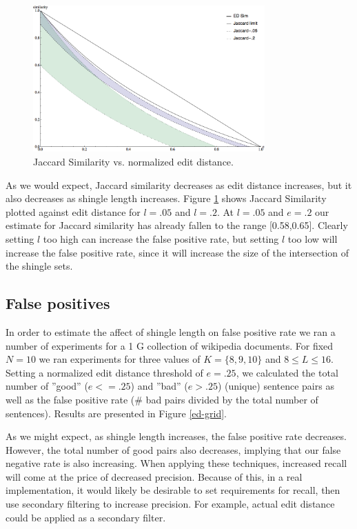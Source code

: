 \documentclass{acm_proc_article-sp}
\begin{document}
\begin{figure}
\centering
\includegraphics[width=3.5in, keepaspectratio = true]{jac-ed-chart.png}
\caption{Jaccard Similarity vs. normalized edit distance.}
\label{jac-ed}
\end{figure}

As we would expect, Jaccard similarity decreases as edit distance increases, but it also decreases as shingle length increases. Figure \ref{jac-ed} shows Jaccard Similarity plotted against edit distance for $l = .05$ and $l = .2$. At $l = .05$ and $e = .2$ our estimate for Jaccard similarity has already fallen to the range [0.58,0.65]. Clearly setting $l$ too high can increase the false positive rate, but setting $l$ too low will increase the false positive rate, since it will increase the size of the intersection of the shingle sets.

\subsection{False positives}

In order to estimate the affect of shingle length on false positive rate we ran a number of experiments for a 1 G collection of wikipedia documents. For fixed $N=10$ we ran experiments for three values of $K=\{8,9,10\}$ and $8 \le L \le 16$. Setting a normalized edit distance threshold of $e = .25$, we calculated the total number of ''good'' ($e <= .25$) and ''bad'' ($e > .25$) (unique) sentence pairs as well as the false positive rate (\# bad pairs divided by the total number of sentences). Results are presented in Figure \ref{ed-grid}.

As we might expect, as shingle length increases, the false positive rate decreases. However, the total number of good pairs also decreases, implying that our false negative rate is also increasing. When applying these techniques, increased recall will come at the price of decreased precision. Because of this, in a real implementation, it would likely be desirable to set requirements for recall, then use secondary filtering to increase precision. For example, actual edit distance could be applied as a secondary filter.
\end{document}
